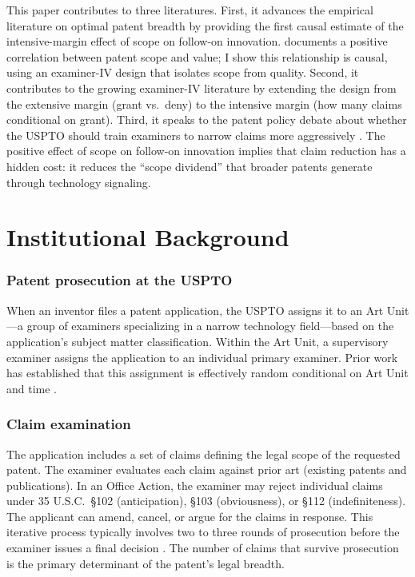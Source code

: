\documentclass[12pt]{article}
\begin{document}
This paper contributes to three literatures. First, it advances the empirical literature on optimal patent breadth by providing the first causal estimate of the intensive-margin effect of scope on follow-on innovation. \citet{lerner1994} documents a positive correlation between patent scope and value; I show this relationship is causal, using an examiner-IV design that isolates scope from quality. Second, it contributes to the growing examiner-IV literature \citep{sampat2019,farre2020,righi2020,lu2024} by extending the design from the extensive margin (grant vs.\ deny) to the intensive margin (how many claims conditional on grant). Third, it speaks to the patent policy debate about whether the USPTO should train examiners to narrow claims more aggressively \citep{lemley2001,frakes2017}. The positive effect of scope on follow-on innovation implies that claim reduction has a hidden cost: it reduces the ``scope dividend'' that broader patents generate through technology signaling.

\section{Institutional Background}

\subsubsection*{Patent prosecution at the USPTO} When an inventor files a patent application, the USPTO assigns it to an Art Unit---a group of examiners specializing in a narrow technology field---based on the application's subject matter classification. Within the Art Unit, a supervisory examiner assigns the application to an individual primary examiner. Prior work has established that this assignment is effectively random conditional on Art Unit and time \citep{sampat2019,farre2020,righi2020}.

\subsubsection*{Claim examination} The application includes a set of claims defining the legal scope of the requested patent. The examiner evaluates each claim against prior art (existing patents and publications). In an Office Action, the examiner may reject individual claims under 35 U.S.C.\ \S102 (anticipation), \S103 (obviousness), or \S112 (indefiniteness). The applicant can amend, cancel, or argue for the claims in response. This iterative process typically involves two to three rounds of prosecution before the examiner issues a final decision \citep{frakes2017}. The number of claims that survive prosecution is the primary determinant of the patent's legal breadth.
\end{document}
